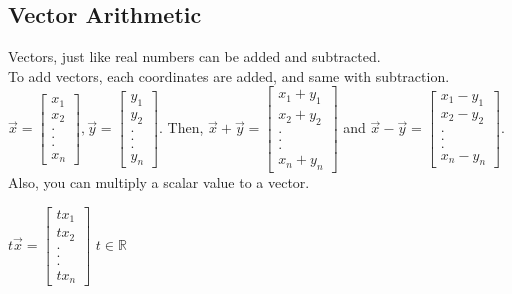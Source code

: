 \documentclass[12pt]{article}
\newcommand{\R}{\mathbb{R}}
\begin{document}
\subsection{Vector Arithmetic}
Vectors, just like real numbers can be added and subtracted.\\
To add vectors, each coordinates are added, and same with subtraction.\\
$\vec{x} = \begin{bmatrix}x_1\\x_2\\.\\.\\.\\x_n\end{bmatrix},    \vec{y} = \begin{bmatrix}y_1\\y_2\\.\\.\\.\\y_n\end{bmatrix}$.
Then, $\vec{x}+\vec{y} = \begin{bmatrix}x_1+y_1\\x_2+y_2\\.\\.\\.\\x_n+y_n\end{bmatrix}$
and $\vec{x}-\vec{y} = \begin{bmatrix}x_1-y_1\\x_2-y_2\\.\\.\\.\\x_n-y_n\end{bmatrix}$.\\

Also, you can multiply a scalar value to a vector. \\
\begin{centering}
$t\vec{x} = \begin{bmatrix}tx_1\\tx_2\\.\\.\\.\\tx_n\end{bmatrix}$ 
$t \in  \R$
\end{centering}
\end{document}
